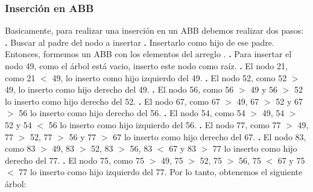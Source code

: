 \documentclass[10pt,a4paper]{article}
\begin{document}
\subsubsection{Inserción en ABB}

Basicamente, para realizar una inserción en un ABB debemos realizar dos pasos:
\newline
\newline
\textbf{.} Buscar al padre del nodo a insertar 
\newline
\newline
\textbf{.} Insertarlo como hijo de ese padre.
\newline
\newline
Entonces, formemos un ABB con los elementos del arreglo \TipoVariable{[49,21,52,56,67,54,77,83,75]}.
\newline
\newline
\textbf{.} Para insertar el nodo 49, como el árbol está vacio, inserto este nodo como raíz.
\newline
\newline
\textbf{.} El nodo 21, como 21 $<$ 49, lo inserto como hijo izquierdo del 49.
\newline
\newline
\textbf{.} El nodo 52, como 52 $>$ 49, lo inserto como hijo derecho del 49.
\newline
\newline
\textbf{.} El nodo 56, como 56 $>$ 49 y 56 $>$ 52 lo inserto como hijo derecho del 52.
\newline
\newline
\textbf{.} El nodo 67, como 67 $>$ 49, 67 $>$ 52 y 67 $>$ 56 lo inserto como hijo derecho del 56.
\newline
\newline
\textbf{.} El nodo 54, como 54 $>$ 49, 54 $>$ 52 y 54 $<$ 56 lo inserto como hijo izquierdo del 56.
\newline
\newline
\textbf{.} El nodo 77, como 77 $>$ 49, 77 $>$ 52, 77 $>$ 56 y 77 $>$ 67 lo inserto como hijo derecho del 67.
\newline
\newline
\textbf{.} El nodo 83, como 83 $>$ 49, 83 $>$ 52, 83 $>$ 56, 83 $<$ 67 y 83 $>$ 77 lo inserto como hijo derecho del 77.
\newline
\newline
\textbf{.} El nodo 75, como 75 $>$ 49, 75 $>$ 52, 75 $>$ 56, 75 $<$ 67 y 75 $<$ 77 lo inserto como hijo izquierdo del 77.
\newline
\newline
Por lo tanto, obtenemos el siguiente árbol:
\end{document}
